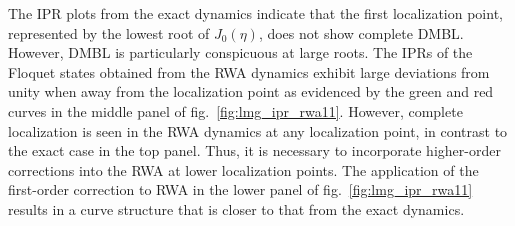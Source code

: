 \documentclass[%
reprint,
superscriptaddress,
amsmath,amssymb,
aps,
prb,
showkeys,
]{revtex4-2}
\begin{document}
The IPR plots from the exact dynamics indicate that the first localization point, represented by the lowest  root of $J_0(\eta)$, does not show complete DMBL. However, DMBL is particularly conspicuous at large roots. The IPRs of the Floquet states obtained from the RWA dynamics exhibit large deviations from unity when away from the localization point as evidenced by the green and red curves in the middle panel of fig.~\ref{fig:lmg_ipr_rwa11}. However, complete localization is seen in the RWA dynamics at any localization point, in contrast to the exact case in the top panel. Thus, it is necessary to incorporate  higher-order corrections into the RWA at lower localization points. The application of the first-order correction to RWA in the lower panel of fig.~\ref{fig:lmg_ipr_rwa11} results in a curve structure that is closer to that from the exact dynamics.
\end{document}
